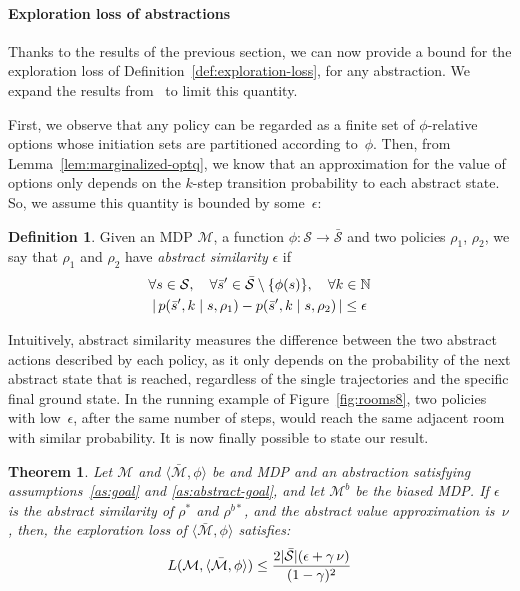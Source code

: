 \documentclass[letterpaper]{article} %
\theoremstyle{plain}
\newtheorem{theorem}{Theorem}
\theoremstyle{definition}
\newtheorem{definition}{Definition}
\theoremstyle{remark}
\DeclarePairedDelimiter{\abs}{\lvert}{\rvert}
\newcommand{\Naturals}{\mathbb{N}}
\newcommand{\Given}{\mid}
\newcommand{\SetSym}[1]{\mathcal{#1}}
\newcommand{\Policy}{\rho}
\newcommand{\States}{\SetSym{S}}
\newcommand{\Model}{\SetSym{M}}
\newcommand{\Mapping}{\phi}
\newcommand{\Biased}[1]{#1^{b}}
\newcommand{\BiasedStar}[1]{#1^{b*}}
\newcommand{\Abst}[1]{\bar{#1}}
\newcommand{\FromBlockTo}[3]{{#3}, {#2}}
\newcommand{\POptAccurate}{\epsilon}
\newcommand{\PHomogeneity}{\nu}
\begin{document}
\paragraph{Exploration loss of abstractions}

Thanks to the results of the previous section, we can now provide a bound for the exploration loss of Definition~\ref{def:exploration-loss}, for any abstraction.
We expand the results from~\cite{abel_2020_ValuePreserving} to limit this quantity.

First, we observe that any policy can be regarded as a finite set of $\Mapping$-relative options whose initiation sets are partitioned according to~$\Mapping$.
Then, from Lemma~\ref{lem:marginalized-optq}, we know that an approximation for the value of options only depends on the $k$-step transition probability to each abstract state.
So, we assume this quantity is bounded by some~$\POptAccurate$:
\begin{definition}
    Given an MDP $\Model$, a function $\Mapping: \States \to \Abst\States$ and two policies $\Policy_1$, $\Policy_2$,
    we say that $\Policy_1$ and $\Policy_2$ have \emph{abstract similarity} $\POptAccurate$ if
	\begin{multline}
		\forall s \in \States,\quad \forall \Abst{s}' \in \Abst{\States} \setminus \{\Mapping(s)\}, \quad
		\forall k \in \Naturals \\
		\abs{\,
			p(\FromBlockTo{s}{k}{\Abst{s}'} \Given s, \Policy_1) -
			p(\FromBlockTo{s}{k}{\Abst{s}'} \Given s, \Policy_2)\,
		} \le \POptAccurate
	\end{multline}
	\label{def:similar-policies}
\end{definition}
Intuitively, abstract similarity measures the difference between the two abstract actions described by each policy,
as it only depends on the probability of the next abstract state that is reached, regardless of the single trajectories and the specific final ground state.
In the running example of Figure~\ref{fig:rooms8},
two policies with low~$\POptAccurate$, after the same number of steps, would reach the same adjacent room with similar probability.
%
It is now finally possible to state our result.
\begin{theorem}
	Let $\Model$ and $\langle \Abst\Model, \Mapping \rangle$ be and MDP and an abstraction satisfying assumptions~\ref{as:goal} and \ref{as:abstract-goal},
	and let $\Biased\Model$ be the biased MDP.
	If $\epsilon$ is the abstract similarity of $\Policy^*$ and $\BiasedStar{\Policy}$, and the abstract value approximation is~$\PHomogeneity$, then, the exploration loss of $\langle \Abst\Model, \Mapping \rangle$ satisfies:
	\begin{equation}
		L(\Model, \langle \Abst\Model, \Mapping \rangle) \le
			\frac{2 \abs{\Abst\States} (\POptAccurate + \gamma\, \PHomogeneity)}{(1-\gamma)^2}
		\label{eq:exploration-loss-bound}
	\end{equation}
	\label{th:exploration-loss-bound}
\end{theorem}
\end{document}
